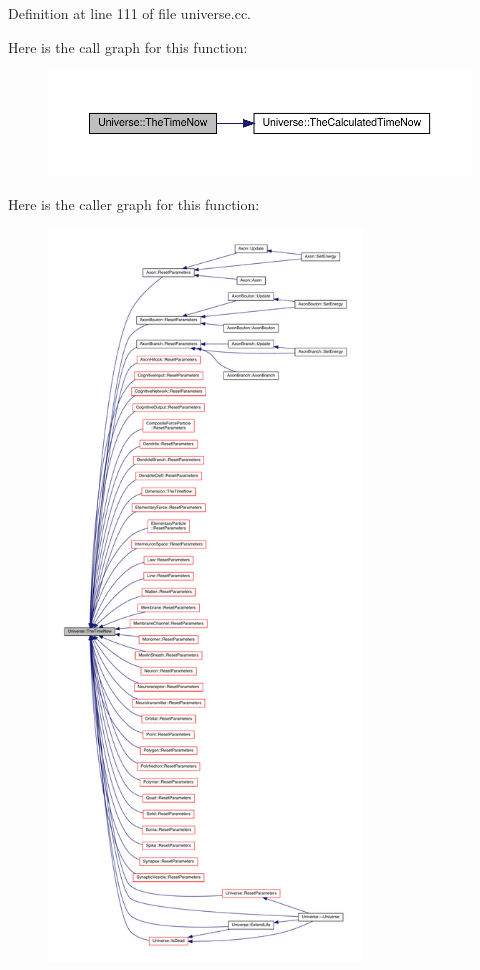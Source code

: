 Definition at line 111 of file universe.\+cc.

Here is the call graph for this function\+:
\nopagebreak
\begin{figure}[H]
\begin{center}
\leavevmode
\includegraphics[width=350pt]{class_universe_ae54d34c5d695917e074b8e07e8820bdb_cgraph}
\end{center}
\end{figure}
Here is the caller graph for this function\+:
\nopagebreak
\begin{figure}[H]
\begin{center}
\leavevmode
\includegraphics[height=550pt]{class_universe_ae54d34c5d695917e074b8e07e8820bdb_icgraph}
\end{center}
\end{figure}
\mbox{\label{class_universe_a64ee5a2c7e86c56fa426acb750438ce9}} 
